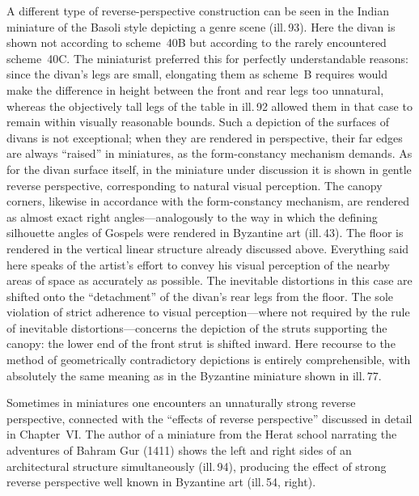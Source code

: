 A different type of reverse-perspective construction can be seen in the Indian
miniature of the Basoli style depicting a genre scene (ill.\,93). Here the divan
is shown not according to scheme~40B but according to the rarely encountered
scheme~40C. The miniaturist preferred this for perfectly understandable reasons:
since the divan's legs are small, elongating them as scheme~B requires would make
the difference in height between the front and rear legs too unnatural, whereas the
objectively tall legs of the table in ill.\,92 allowed them in that case to remain
within visually reasonable bounds. Such a depiction of the surfaces of divans is
not exceptional; when they are rendered in perspective, their far edges are always
``raised'' in miniatures, as the form-constancy mechanism demands. As for the divan
surface itself, in the miniature under discussion it is shown in gentle reverse
perspective, corresponding to natural visual perception. The canopy corners,
likewise in accordance with the form-constancy mechanism, are rendered as almost
exact right angles---analogously to the way in which the defining silhouette angles
of Gospels were rendered in Byzantine art (ill.\,43). The floor is rendered in the
vertical linear structure already discussed above. Everything said here speaks of
the artist's effort to convey his visual perception of the nearby areas of space as
accurately as possible. The inevitable distortions in this case are shifted onto the
``detachment'' of the divan's rear legs from the floor. The sole violation of strict
adherence to visual perception---where not required by the rule of inevitable
distortions---concerns the depiction of the struts supporting the canopy: the lower
end of the front strut is shifted inward. Here recourse to the method of
geometrically contradictory depictions is entirely comprehensible, with absolutely
the same meaning as in the Byzantine miniature shown in ill.\,77.


Sometimes in miniatures one encounters an unnaturally strong reverse perspective,
connected with the ``effects of reverse perspective'' discussed in detail in
Chapter~VI. The author of a miniature from the Herat school narrating the
adventures of Bahram Gur (1411) shows the left and right sides of an architectural
structure simultaneously (ill.\,94), producing the effect of strong reverse
perspective well known in Byzantine art (ill.\,54, right).

